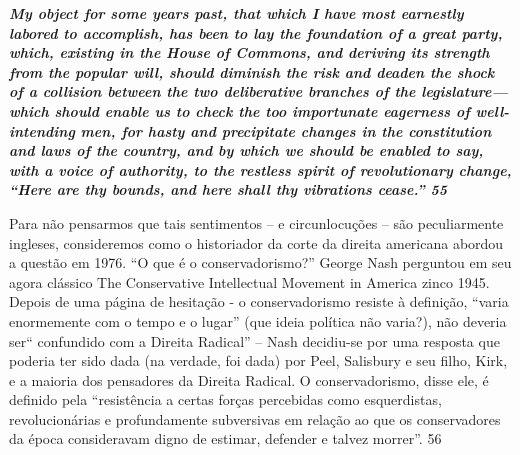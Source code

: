 \par
 

 \textbf{\textit{My object for some years past, that which I have most earnestly labored to accomplish, has been to lay the foundation of a great party, which, existing in the House of Commons, and deriving its strength from the popular will, should diminish the risk and deaden the shock of a collision between the two deliberative branches of the legislature—which should enable us to check the too importunate eagerness of well-intending men, for hasty and precipitate changes in the constitution and laws of the country, and by which we should be enabled to say, with a voice of authority, to the restless spirit of revolutionary change, “Here are thy bounds, and here shall thy vibrations cease.” {{\color{blue} 55} } } }  
 
 
\par
 
Para não pensarmos que tais sentimentos – e circunlocuções – são peculiarmente ingleses, consideremos como o historiador da corte da direita americana abordou a questão em 1976. “O que é o conservadorismo?” George Nash perguntou em seu agora clássico The Conservative Intellectual Movement in America zinco 1945. Depois de uma página de hesitação - o conservadorismo resiste à definição, “varia enormemente com o tempo e o lugar” (que ideia política não varia?), não deveria ser“ confundido com a Direita Radical” – Nash decidiu-se por uma resposta que poderia ter sido dada (na verdade, foi dada) por Peel, Salisbury e seu filho, Kirk, e a maioria dos pensadores da Direita Radical. O conservadorismo, disse ele, é definido pela “resistência a certas forças percebidas como esquerdistas, revolucionárias e profundamente subversivas em relação ao que os conservadores da época consideravam digno de estimar, defender e talvez morrer”.
 {\color{blue} 56}  

 
\par
 
